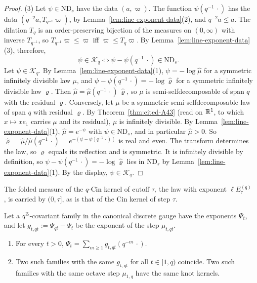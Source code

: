 \begin{proof}
(3) Let $\psi \in \mathrm{ND}_s$ have the data $(a, \varpi)$. The function
$\psi(q^{-1}\,\cdot)$ has the data $(q^{-2}a, T_{q^{-1}}\varpi)$, by
Lemma~\ref{lem:line-exponent-data}(2), and $q^{-2}a \le a$. The dilation $T_q$ is an order-preserving
bijection of the measures on $(0,\infty)$ with inverse $T_{q^{-1}}$, so $T_{q^{-1}}\varpi \le \varpi$
iff $\varpi \le T_q\varpi$. By Lemma~\ref{lem:line-exponent-data}(3), therefore,
\[
  \psi \in \mathcal{K}_q \iff \psi - \psi(q^{-1}\,\cdot) \in \mathrm{ND}_s .
\]
Let $\psi \in \mathcal{K}_q$. By Lemma~\ref{lem:line-exponent-data}(1), $\psi = -\log\widehat\mu$
for a symmetric infinitely divisible law $\mu$, and $\psi - \psi(q^{-1}\,\cdot) = -\log\widehat\varrho$
for a symmetric infinitely divisible law $\varrho$. Then
$\widehat\mu = \widehat\mu(q^{-1}\,\cdot)\,\widehat\varrho$, so $\mu$ is semi-selfdecomposable of
span $q$ with the residual $\varrho$. Conversely, let $\mu$ be a symmetric semi-selfdecomposable law
of span $q$ with residual $\varrho$. By Theorem~\ref{thm:cited-A43} (read on $\mathbb{R}^1$, to which $x \mapsto xe_1$ carries $\mu$ and its
residual), $\mu$ is infinitely divisible. By
Lemma~\ref{lem:line-exponent-data}(1), $\widehat\mu = e^{-\psi}$ with $\psi \in \mathrm{ND}_s$, and
in particular $\widehat\mu > 0$. So
$\widehat\varrho = \widehat\mu/\widehat\mu(q^{-1}\,\cdot) = e^{-(\psi - \psi(q^{-1}\,\cdot))}$ is real
and even. The transform determines the law, so $\varrho$ equals its reflection and is symmetric. It
is infinitely divisible by definition, so $\psi - \psi(q^{-1}\,\cdot) = -\log\widehat\varrho$ lies
in $\mathrm{ND}_s$ by Lemma~\ref{lem:line-exponent-data}(1). By the display, $\psi \in \mathcal{K}_q$.
\end{proof}

The folded \Levy{} measure of the $q$-Cin kernel of cutoff $\tau$, the law with exponent
$\ell E^{(q)}_\tau$, is carried by $(0,\tau]$, as is that of the Cin kernel of step $\tau$.

\begin{lemma}
\label{lem:step-field-determines-family}

Let a $q^{\mathbb{Z}}$-covariant family in the canonical discrete gauge have the exponents $\Psi_t$, and
let $g_{t,qt} := \Psi_{qt} - \Psi_t$ be the exponent of the step $\mu_{t,qt}$.
\begin{enumerate}
\item For every $t > 0$, $\Psi_t = \sum_{m \ge 1}g_{t,qt}(q^{-m}\,\cdot)$.
\item Two such families with the same $g_{t,qt}$ for all $t \in [1,q)$ coincide. Two such families
with the same octave step $\mu_{1,q}$ have the same knot kernels.
\end{enumerate}
\end{lemma}

